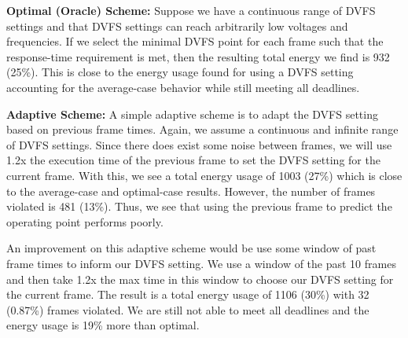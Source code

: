 \documentclass[11pt, letterpaper]{article}
\begin{document}
\textbf{Optimal (Oracle) Scheme: } 
Suppose we have a continuous range of DVFS settings and that DVFS settings can
reach arbitrarily low voltages and frequencies. If we select the minimal
DVFS point for each frame such that the response-time requirement is met, then
the resulting total energy we find is 932 (25\%). This is close to the energy
usage found for using a DVFS setting accounting for the average-case behavior
while still meeting all deadlines.

% 

\textbf{Adaptive Scheme: }
A simple adaptive scheme is to adapt the DVFS setting based on previous frame times.
Again, we assume a continuous and infinite range of DVFS settings. Since there
does exist some noise between frames, we will use 1.2x the execution time of
the previous frame to set the DVFS setting for the current frame. With this, we
see a total energy usage of 1003 (27\%) which is close to the average-case and
optimal-case results. However, the number of frames violated is 481 (13\%).
Thus, we see that using the previous frame to predict the operating point
performs poorly.

An improvement on this adaptive scheme would be use some window of past frame
times to inform our DVFS setting. We use a window of the past 10 frames and
then take 1.2x the max time in this window to choose our DVFS setting for the
current frame. The result is a total energy usage of 1106 (30\%) with 32
(0.87\%) frames violated. We are still not able to meet all deadlines and the
energy usage is 19\% more than optimal.
\end{document}
